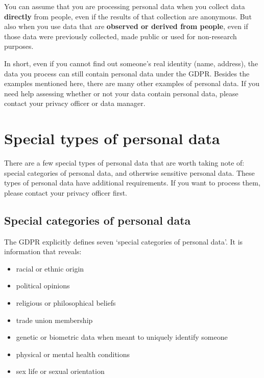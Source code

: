 \documentclass[
]{book}
\providecommand{\tightlist}{%
  \setlength{\itemsep}{0pt}\setlength{\parskip}{0pt}}
\begin{document}
You can assume that you are processing personal data when you collect data
\textbf{directly} from people, even if the results of that collection are anonymous. But
also when you use data that are \textbf{observed or derived from people}, even if those
data were previously collected, made public or used for non-research purposes.

In short, even if you cannot find out someone's real identity (name, address),
the data you process can still contain personal data under the GDPR. Besides
the examples mentioned here, there are many
other examples of personal data. If you need help assessing whether or not your
data contain personal data, please contact your
privacy officer
or data manager.

\hypertarget{special-types-personal-data}{%
\section{Special types of personal data}\label{special-types-personal-data}}

There are a few special types of personal data that are worth taking note of:
special categories of personal data, and otherwise sensitive personal data.
These types of personal data have additional requirements. If you want to
process them, please contact your
privacy officer
first.

\hypertarget{special-categories-of-personal-data}{%
\subsection{Special categories of personal data}\label{special-categories-of-personal-data}}

The GDPR explicitly defines seven `special categories of personal data'. It is
information that reveals:

\begin{itemize}
\tightlist
\item
  racial or ethnic origin
\item
  political opinions
\item
  religious or philosophical beliefs
\item
  trade union membership
\item
  genetic or biometric data when meant to uniquely identify someone
\item
  physical or mental health conditions
\item
  sex life or sexual orientation
\end{itemize}
\end{document}
